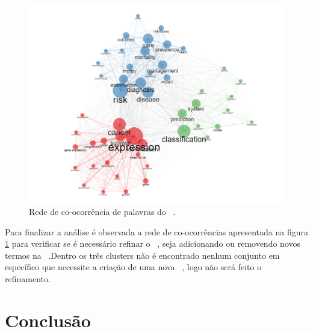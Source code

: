 \begin{figure}
    \centering
    \includegraphics[width=1\textwidth]{experiments/vinis-caixe/PesqBibliogr/MineracaoDados/WoS-20220204/Dataset/Coocurrence-2022-02-10.PNG}
    \caption{Rede de co-ocorrência de palavras do \dataset\ .}
    \label{fig:cit:coocurrence:vinis-caixe}
\end{figure}

Para finalizar a análise é observada a rede de co-ocorrências apresentada na figura \ref{fig:cit:coocurrence:vinis-caixe} para verificar se é necessário refinar o \dataset\ , seja adicionando ou removendo novos termos na \query\ .Dentro os três clusters não é encontrado nenhum conjunto em específico que necessite a criação de uma nova \query\ , logo não será feito o refinamento.

\section{Conclusão}

